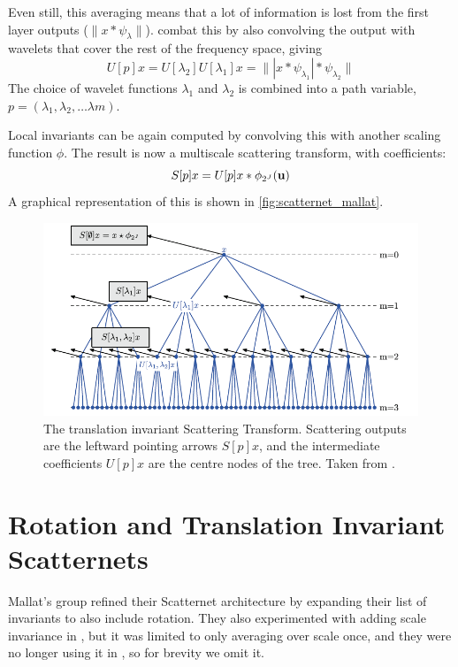  Even still, this averaging means that a lot of information is lost from the
  first layer outputs ($\|x \ast \psi_{\lambda}\|$).
  \citeauthor{bruna_invariant_2013} combat this by also convolving the output
  with wavelets that cover the rest of the frequency space, giving  
  $$U[p]x = U[\lambda_2]U[\lambda_1]x = \| | x \ast \psi_{\lambda_1}| 
    \ast \psi_{\lambda_2} \|$$
  The choice of wavelet functions $\lambda_{1}$ and $\lambda_{2}$ is combined
  into a path variable, $p = (\lambda_1, \lambda_2, \ldots \lambda{m})$.

  Local invariants can be again computed by convolving this with another scaling
  function $\phi$. The result is now a multiscale scattering transform, with
  coefficients:
  $$ S[p]x = U[p]x \ast \phi_{2^J}(\mathbf{u}) $$
  A graphical representation of this is shown in
  \autoref{fig:scatternet_mallat}.

  \begin{figure}
    \centering
      \includegraphics[width=\textwidth]{images/scatternet_diagram.png}
      \caption[Translation Invariant Scatternet Layout]
              {The translation invariant Scattering Transform. Scattering outputs
               are the leftward pointing arrows $S[p]x$, and the intermediate 
               coefficients $U[p]x$ are the centre nodes of the tree. Taken
               from \citep{bruna_invariant_2013}.}
      \label{fig:scatternet_mallat}
  \end{figure}


\section{Rotation and Translation Invariant Scatternets}
  Mallat's group refined their Scatternet architecture by expanding their list
  of invariants to also include rotation. They also experimented with adding
  scale invariance in \citep{sifre_rotation_2013}, but it was limited to only
  averaging over scale once, and they were no longer using
  it in \citep{oyallon_deep_2015}, so for brevity we omit it. 
  

